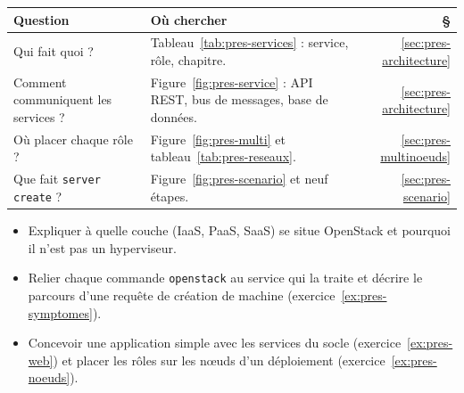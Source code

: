 \begin{center}
\renewcommand{\arraystretch}{1.3}
\begin{tabular}{@{}>{\raggedright\arraybackslash}p{4.4cm}>{\raggedright\arraybackslash}p{9.4cm}r@{}}
\toprule
\textbf{Question} & \textbf{Où chercher} & \textbf{§} \\
\midrule
Qui fait quoi ? & Tableau~\ref{tab:pres-services} : service, rôle, chapitre. & \ref{sec:pres-architecture} \\
Comment communiquent les services ? & Figure~\ref{fig:pres-service} : API REST, bus de messages, base de données. &
  \ref{sec:pres-architecture} \\
Où placer chaque rôle ? & Figure~\ref{fig:pres-multi} et tableau~\ref{tab:pres-reseaux}. & \ref{sec:pres-multinoeuds} \\
Que fait \texttt{server create} ? & Figure~\ref{fig:pres-scenario} et neuf étapes. & \ref{sec:pres-scenario} \\
\bottomrule
\end{tabular}
\end{center}

\begin{savoirfaire}
\begin{itemize}
  \item Expliquer à quelle couche (IaaS, PaaS, SaaS) se situe OpenStack et pourquoi il n'est pas un hyperviseur.
  \item Relier chaque commande \texttt{openstack} au service qui la traite et décrire le parcours d'une requête de création de machine
        (exercice~\ref{ex:pres-symptomes}).
  \item Concevoir une application simple avec les services du socle (exercice~\ref{ex:pres-web}) et placer les rôles sur les nœuds d'un
        déploiement (exercice~\ref{ex:pres-noeuds}).
\end{itemize}
\end{savoirfaire}

